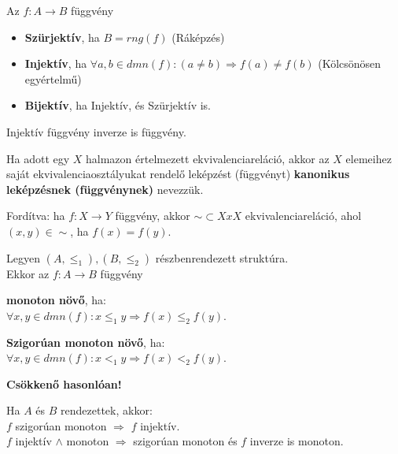 \begin{frame}
\begin{tcolorbox}[title={Def.: Függvények típusai}]
Az $f: A \rightarrow B$ függvény\\
\begin{itemize}
\item \textbf{Szürjektív}, ha $B = rng(f)$ (Ráképzés)
\item \textbf{Injektív}, ha ${\forall} a, b \in dmn(f) : (a \neq b) \Rightarrow f(a) \neq f(b)$ (Kölcsönösen egyértelmű)
\item \textbf{Bijektív}, ha Injektív, és Szürjektív is.
\end{itemize}
\end{tcolorbox}

\begin{tcolorbox}[title={Ész}]
Injektív függvény inverze is függvény.
\end{tcolorbox}

\begin{tcolorbox}[title={Def.: Kanonikus leképzés}]
Ha adott egy $X$ halmazon értelmezett ekvivalenciareláció, akkor az $X$ elemeihez saját ekvivalenciaosztályukat rendelő leképzést (függvényt) \textbf{kanonikus leképzésnek (függvénynek)} nevezzük.\\
\msmallskip

Fordítva: ha $f: X \rightarrow Y$ függvény, akkor $\sim \subset X x X$ ekvivalenciareláció, ahol $(x, y) \in {\sim}$, ha $f(x) = f(y)$.
\end{tcolorbox}
\end{frame}

\begin{frame}
\begin{tcolorbox}[title={Def.: Monoton, Szigorúan monoton függvények}]
Legyen $(A, {\leq}_1), (B, {\leq}_2)$ részbenrendezett struktúra.\\
Ekkor az $f : A \rightarrow B$ függvény\\
\mmedskip

\textbf{monoton növő}, ha:\\
${\forall}x, y \in dmn(f) : x {\leq}_1 y \Rightarrow f(x) {\leq}_2 f(y)$.\\
\mmedskip

\textbf{Szigorúan monoton növő}, ha:\\
${\forall}x, y \in dmn(f) : x <_1 y \Rightarrow f(x) <_2 f(y)$.\\
\mmedskip

\textbf{Csökkenő hasonlóan!}
\end{tcolorbox}

\begin{tcolorbox}[title={Ész}]
Ha $A$ és $B$ rendezettek, akkor:\\
$f$ szigorúan monoton $\Rightarrow$ $f$ injektív.\\
$f$ injektív $\land$ monoton $\Rightarrow$ szigorúan monoton és $f$ inverze is monoton.
\end{tcolorbox}
\end{frame}


